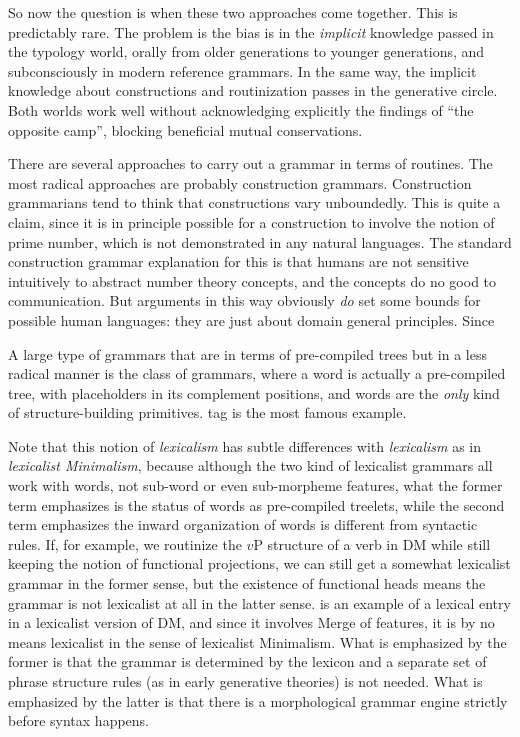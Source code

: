 \documentclass[../main.tex]{subfiles}
\begin{document}
So now the question is when these two approaches come together.
This is predictably rare.
The problem is the bias is in the \emph{implicit} knowledge passed in the typology world, 
orally from older generations to younger generations,
and subconsciously in modern reference grammars.
In the same way, the implicit knowledge about constructions and routinization
passes in the generative circle.
Both worlds work well without acknowledging explicitly the findings of ``the opposite camp'',
blocking beneficial mutual conservations.

There are several approaches to carry out a grammar in terms of routines. 
The most radical approaches are probably construction grammars.
Construction grammarians tend to think that constructions vary unboundedly.
This is quite a claim, since it is in principle possible for a construction to involve the notion of prime number,
which is not demonstrated in any natural languages.
The standard construction grammar explanation for this is 
that humans are not sensitive intuitively to abstract number theory concepts,
and the concepts do no good to communication.
But arguments in this way obviously \emph{do} set some bounds for possible human languages:
they are just about domain general principles.
Since 

A large type of grammars that are in terms of pre-compiled trees but in a less radical manner
is the class of  grammars, where 
a word is actually a pre-compiled tree, with placeholders in its complement positions, and words 
are the \emph{only} kind of structure-building primitives. 
\ac{tag} is the most famous example.

Note that this notion of \emph{lexicalism} has subtle differences 
with \emph{lexicalism} as in \emph{lexicalist Minimalism}, 
because although the two kind of lexicalist grammars all work with words, 
not sub-word or even sub-morpheme features, 
what the former term emphasizes is the status of words as pre-compiled treelets, 
while the second term emphasizes the inward organization of words is different from syntactic rules. 
If, for example, we routinize the $v$P structure of a verb in DM
while still keeping the notion of functional projections, 
we can still get a somewhat lexicalist grammar in the former sense, 
but the existence of functional heads means the grammar is not lexicalist at all in the latter sense.
 is an example of a lexical entry in a lexicalist version of DM, 
and since it involves Merge of features, it is by no means lexicalist in the sense of lexicalist Minimalism.
What is emphasized by the former  is that the grammar is determined by the lexicon 
and a separate set of phrase structure rules (as in early generative theories)
is not needed.
What is emphasized by the latter  is that there is a morphological grammar engine 
strictly before syntax happens.
\end{document}
